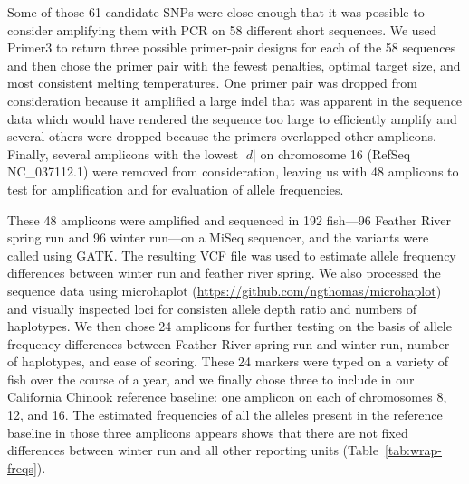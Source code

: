Some of those 61 candidate SNPs were close enough that it was possible to consider amplifying them
with PCR on 58 different short sequences.  We used Primer3 \citep{untergasser2012primer3} to return
three possible primer-pair designs for each of the 58 sequences and then chose the primer pair
with the fewest penalties, optimal target size, and most consistent
melting temperatures.  One primer pair was dropped from consideration because it
amplified a large indel that was apparent in the sequence data which would have rendered
the sequence too large to efficiently amplify and several others were dropped because the primers
overlapped other amplicons.  Finally, several amplicons with the lowest $|d|$ on chromosome 16
(RefSeq NC\_037112.1) were removed from consideration, leaving us with 48 amplicons to test
for amplification and for evaluation of allele frequencies.

These 48 amplicons were amplified and sequenced in 192 fish---96 Feather River spring run
and 96 winter run---on a MiSeq sequencer, and the variants were called using
GATK.  The resulting VCF file was used to estimate allele frequency differences between
winter run and feather river spring.  We also processed the sequence data using
microhaplot (\url{https://github.com/ngthomas/microhaplot}) and visually inspected
loci for consisten allele depth ratio and numbers of haplotypes.  We then chose 24 amplicons for further
testing on the basis of allele frequency differences between Feather River spring run and
winter run, number of haplotypes, and ease of scoring.  These 24 markers were typed on
a variety of fish over the course of a year, and we finally chose three to include in
our California Chinook reference baseline: one amplicon on each of chromosomes
8, 12, and 16.  The estimated frequencies of all the alleles present in the reference baseline
in those three amplicons appears shows that there are not fixed differences between
winter run and all other reporting units (Table~\ref{tab:wrap-freqs}).



